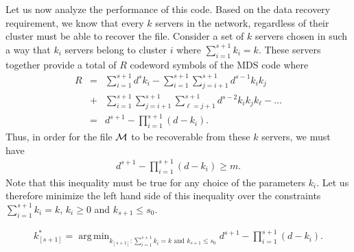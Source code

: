 \documentclass[journal,onecolumn,draftcls]{IEEEtran}
\DeclareMathOperator*{\argmin}{arg\,min}
\begin{document}
Let us now analyze the performance of this code. Based on the data recovery requirement, we know that every $k$ servers in the network, regardless of their cluster must be able to recover the file. Consider a set of $k$ servers chosen in such a way that $k_i$ servers belong to cluster $i$ where $\sum_{i=1}^{s+1}{k_i} = k$. These servers together provide a total of $R$ codeword symbols of the MDS code where
\begin{eqnarray*}
R &=& \sum_{i=1}^{s+1} d^{s}k_i - \sum_{i=1}^{s+1}\sum_{j= i+1}^{s+1} d^{s-1}k_i k_j\\ &+& \sum_{i=1}^{s+1}\sum_{j= i+1}^{s+1}\sum_{\ell = j+1}^{s+1} d^{s-2}k_i k_j k_\ell -\dots\\
&=& d^{s+1} - \prod_{i=1}^{s+1}(d-k_i).
\end{eqnarray*}
Thus, in order for the file ${\cal M}$ to be recoverable from these $k$ servers, we must have
\begin{eqnarray}
d^{s+1} - \prod_{i=1}^{s+1}(d-k_i) \ge m.
\label{eqn:boundedm}
\end{eqnarray}
Note that this inequality must be true for any choice of the parameters $k_i$. Let us therefore minimize the left hand side of this inequality over the constraints $\sum_{i=1}^{s+1}k_i = k$, $k_i \ge 0$ and $k_{s+1}\le s_0$.

\begin{eqnarray}
k^*_{[s+1]}  = \argmin_{k_{[s+1]}:\sum_{i=1}^{s+1}k_i = k\mbox{   and   }k_{s+1}\le s_0} d^{s+1} - \prod_{i=1}^{s+1}(d-k_i).
\label{eqn:bestk}
\end{eqnarray}
\end{document}

